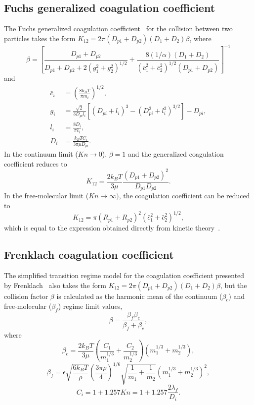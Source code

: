 \documentclass[preprint,letterpaper]{elsarticle}
\begin{document}
\subsection{Fuchs generalized coagulation coefficient}
\label{a:FUCHS}
The Fuchs generalized coagulation coefficient~\cite{Fuchs_1964} for the collision between two particles takes the form $K_{12}=2\pi (D_{p1}+D_{p2})(D_1+D_2)\beta$, where
\begin{equation}
    \beta = \left[ \frac{D_{p1}+D_{p2}}{D_{p1}+D_{p2}+2(g_1^2+g_2^2)^{1/2}} + \frac{8(1/\alpha)(D_1+D_2)}{(\bar{c}_1^2+\bar{c}_2^2)^{1/2}(D_{p1}+D_{p2})} \right]^{-1}
\end{equation}
and 
\begin{align}
    \bar{c}_i &= \left( \frac{8k_B T}{\pi m_i} \right)^{1/2}, \\
    g_i &= \frac{\sqrt{2}}{3D_{pi}l_i} \left[ (D_{pi}+l_i)^3 - (D_{pi}^2+l_i^2)^{3/2} \right] - D_{pi}, \\
    l_i &= \frac{8D_i}{\pi \bar{c}_i}, \\
    D_i &= \frac{k_B T C_i}{3\pi \mu D_{pi}}.
\end{align}
In the continuum limit ($Kn \rightarrow 0$), $\beta=1$ and the generalized coagulation coefficient reduces to
\begin{equation}
    K_{12}=\frac{2k_BT}{3\mu} \frac{(D_{p1}+D_{p2})^2}{D_{p1}D_{p2}}.
\end{equation}
In the free-molecular limit ($Kn \rightarrow \infty)$, the coagulation coefficient can be reduced to
\begin{equation}
    K_{12} = \pi (R_{p1}+R_{p2})^2 (\bar{c}_1^2 + \bar{c}_2^2)^{1/2},
\end{equation}
which is equal to the expression obtained directly from kinetic theory~\cite{Seinfeld_2016}.

\subsection{Frenklach coagulation coefficient}
\label{a:FRENK}

The simplified transition regime model for the coagulation coefficient presented by Frenklach~\cite{Frenklach_2002b} also takes the form $K_{12}=2\pi (D_{p1}+D_{p2})(D_1+D_2)\beta$, but the collision factor $\beta$ is calculated as the harmonic mean of the continuum ($\beta_c$) and free-molecular ($\beta_f$) regime limit values,
\begin{equation}
    \beta = \frac{\beta_f \beta_c}{\beta_f + \beta_c},
\end{equation}
where
\begin{equation}
    \beta_c = \frac{2k_BT}{3 \mu} \left( \frac{C_1}{m_1^{1/3}} + \frac{C_2}{m_2^{1/3}} \right) (m_1^{1/3}+m_2^{1/3}),
\end{equation}
\begin{equation}
    \beta_f = \epsilon \sqrt{\frac{6k_BT}{\rho}} \left( \frac{3\pi \rho}{4} \right)^{1/6} \sqrt{\frac{1}{m_1}+\frac{1}{m_2}} (m_1^{1/3}+m_2^{1/3})^2,
\end{equation}
\begin{equation}
    C_i = 1 + 1.257Kn = 1 + 1.257 \frac{2\lambda_f}{D_i}.
\end{equation}
\end{document}
